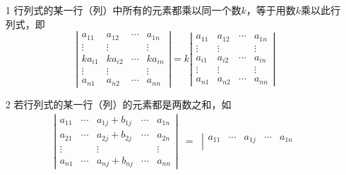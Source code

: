 \begin{frame}
  \begin{xingzhi}[线性性质]
    \begin{itemize}
    \item[1] 行列式的某一行（列）中所有的元素都乘以同一个数$k$，等于用数$k$乘以此行列式，即
      \begin{equation}\label{xz3-1}
        \left|
          \begin{array}{ccccc}
            a_{11}  & a_{12} & \cdots & a_{1n} \\
            \vdots & \vdots     &        & \vdots \\
            ka_{i1}  & ka_{i2} & \cdots & ka_{in} \\
            \vdots & \vdots     &        & \vdots \\
            a_{n1}  & a_{n2} & \cdots & a_{nn}
          \end{array}
        \right| = k
        \left|
          \begin{array}{ccccc}
            a_{11}  & a_{12} & \cdots & a_{1n} \\
            \vdots & \vdots     &        & \vdots \\
            a_{i1}  & a_{i2} & \cdots & a_{in} \\
            \vdots & \vdots     &        & \vdots \\
            a_{n1}  & a_{n2} & \cdots & a_{nn}
          \end{array}
        \right|
      \end{equation}
    \item[2] 若行列式的某一行（列）的元素都是两数之和，如       \begin{equation}\label{xz3-2}
        \begin{array}{rcl}
          \left|
          \begin{array}{ccccc}
            a_{11} & \cdots & a_{1j}+b_{1j} & \cdots & a_{1n} \\
            a_{21} & \cdots & a_{2j}+b_{2j} & \cdots & a_{2n} \\
            \vdots&        & \vdots      &        & \vdots \\
            a_{n1} & \cdots & a_{nj}+b_{nj} & \cdots & a_{nn}
          \end{array}
                                                       \right| & = & \left|
                                                                     \begin{array}{ccccc}
                                                                       a_{11} & \cdots & a_{1j} & \cdots & a_{1n} \\

\end{array}
\end{array}
\end{equation}
\end{itemize}
\end{xingzhi}
\end{frame}
